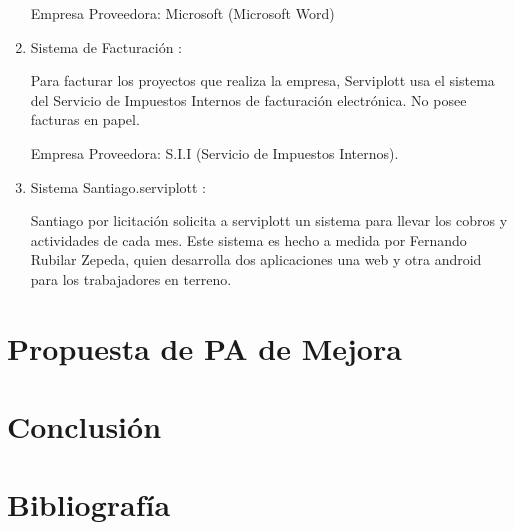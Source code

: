 \begin{enumerate}[1)]
Empresa Proveedora: Microsoft (Microsoft Word)

	\item Sistema de Facturación :


Para facturar los proyectos que realiza la empresa, Serviplott usa el sistema del Servicio de Impuestos Internos de facturación electrónica. No posee facturas en papel.


Empresa Proveedora: S.I.I (Servicio de Impuestos Internos).

	\item Sistema Santiago.serviplott :

Santiago por licitación solicita a serviplott un sistema para llevar los cobros y actividades de cada mes. Este sistema es hecho a medida por Fernando Rubilar Zepeda, quien desarrolla dos aplicaciones una web y otra android para los trabajadores en terreno.


	
	\end{enumerate}
		
\section{Propuesta de PA de Mejora}
\section{Conclusión}
\section{Bibliografía}

	

